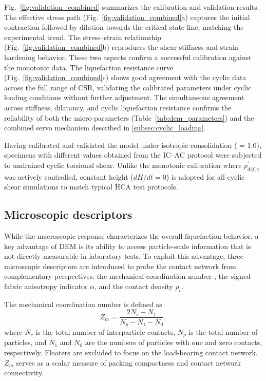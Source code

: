 Fig.~\ref{fig:validation_combined} summarizes the calibration and validation results. The effective stress path (Fig.~\ref{fig:validation_combined}a) captures the initial contraction followed by dilation towards the critical state line, matching the experimental trend. The stress--strain relationship (Fig.~\ref{fig:validation_combined}b) reproduces the shear stiffness and strain-hardening behavior. These two aspects confirm a successful calibration against the monotonic data. The liquefaction resistance curve (Fig.~\ref{fig:validation_combined}c) shows good agreement with the cyclic data across the full range of CSR, validating the calibrated parameters under cyclic loading conditions without further adjustment. The simultaneous agreement across stiffness, dilatancy, and cyclic liquefaction resistance confirms the reliability of both the micro-parameters (Table~\ref{tab:dem_parameters}) and the combined servo mechanism described in \cref{subsec:cyclic_loading}.

Having calibrated and validated the model under isotropic consolidation (\Kzero{} = 1.0), specimens with different \Kzero{} values obtained from the IC--AC protocol were subjected to undrained cyclic torsional shear. Unlike the monotonic calibration where $p_{dif,z}^{\prime}$ was actively controlled, constant height ($dH/dt=0$) is adopted for all cyclic shear simulations to match typical HCA test protocols.

\subsection{Microscopic descriptors}
\label{subsec:micro_descriptors}

While the macroscopic response characterizes the overall liquefaction behavior, a key advantage of DEM is its ability to access particle-scale information that is not directly measurable in laboratory tests. To exploit this advantage, three microscopic descriptors are introduced to probe the contact network from complementary perspectives: the mechanical coordination number \Zm{}, the signed fabric anisotropy indicator $\alpha$, and the contact density $\rho_c$.

The mechanical coordination number \citep{Thornton2000,Oda1977} is defined as
\begin{equation}
Z_m = \frac{2N_c - N_1}{N_p - N_1 - N_0},
\label{eq:zm_definition_method}
\end{equation}
where $N_c$ is the total number of interparticle contacts, $N_p$ is the total number of particles, and $N_1$ and $N_0$ are the numbers of particles with one and zero contacts, respectively. Floaters are excluded to focus on the load-bearing contact network. $Z_m$ serves as a scalar measure of packing compactness and contact network connectivity.


